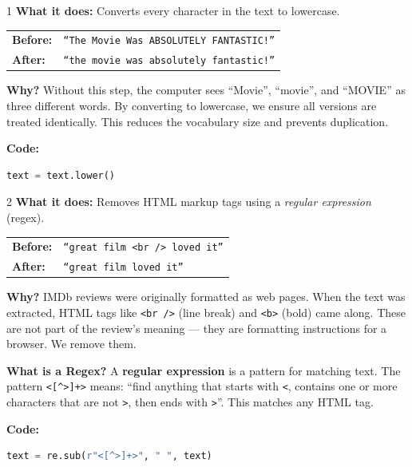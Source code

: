 \documentclass[12pt, a4paper]{article}
\begin{document}
\begin{stepbox}[Lowercasing]{1}
\textbf{What it does:} Converts every character in the text to lowercase.

\medskip
\begin{center}
\begin{tabular}{ll}
\textbf{Before:} & \texttt{``The Movie Was ABSOLUTELY FANTASTIC!''} \\
\textbf{After:}  & \texttt{``the movie was absolutely fantastic!''} \\
\end{tabular}
\end{center}

\medskip
\textbf{Why?} Without this step, the computer sees ``Movie'', ``movie'', and ``MOVIE'' as three different words. By converting to lowercase, we ensure all versions are treated identically. This reduces the vocabulary size and prevents duplication.

\medskip
\textbf{Code:}
\begin{lstlisting}[language=Python]
text = text.lower()
\end{lstlisting}
\end{stepbox}

\begin{stepbox}{2}
\textbf{What it does:} Removes HTML markup tags using a \emph{regular expression} (regex).

\medskip
\begin{center}
\begin{tabular}{ll}
\textbf{Before:} & \texttt{``great film \textless{}br /\textgreater{} loved it''} \\
\textbf{After:}  & \texttt{``great film   loved it''} \\
\end{tabular}
\end{center}

\medskip
\textbf{Why?} IMDb reviews were originally formatted as web pages. When the text was extracted, HTML tags like \texttt{<br />} (line break) and \texttt{<b>} (bold) came along. These are not part of the review's meaning — they are formatting instructions for a browser. We remove them.

\medskip
\textbf{What is a Regex?} A \textbf{regular expression} is a pattern for matching text. The pattern \texttt{<[{\textasciicircum}>]+>} means: ``find anything that starts with \texttt{<}, contains one or more characters that are not \texttt{>}, then ends with \texttt{>}''. This matches any HTML tag.

\medskip
\textbf{Code:}
\begin{lstlisting}[language=Python]
text = re.sub(r"<[^>]+>", " ", text)
\end{lstlisting}
\end{stepbox}
\end{document}
